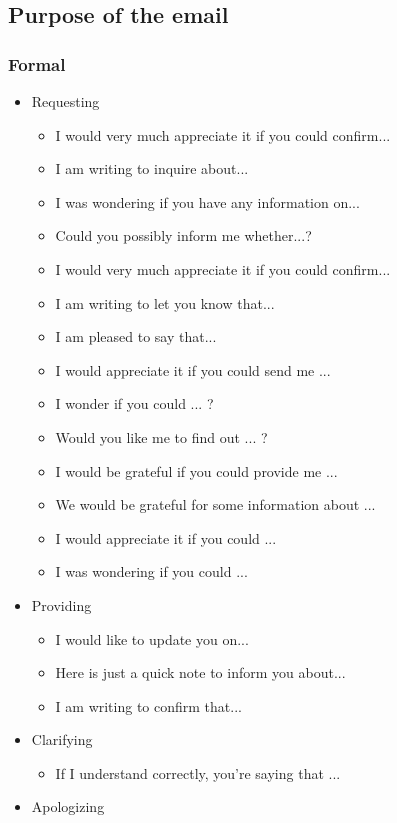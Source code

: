 \subsection{Purpose of the email}

\subsubsection{Formal}
\begin{itemize}
\item Requesting
	\begin{itemize}
	\item I would very much appreciate it if you could confirm...
	\item I am writing to inquire about...
	\item I was wondering if you have any information on...
	\item Could you possibly inform me whether...?
	\item I would very much appreciate it if you could confirm...
	\item I am writing to let you know that...
	\item I am pleased to say that...
	\item I would appreciate it if you could send me ...
	\item I wonder if you could ... ?
	\item Would you like me to find out ... ?
	\item I would be grateful if you could provide me ...
	\item We would be grateful for some information about ...
	\item I would appreciate it if you could ...
	\item I was wondering if you could ...
	\end{itemize}
\item Providing
	\begin{itemize}
	\item I would like to update you on...
	\item Here is just a quick note to inform you about...
	\item I am writing to confirm that...
	\end{itemize}
\item Clarifying
	\begin{itemize}
	\item If I understand correctly, you're saying that ...
	\end{itemize}
\item Apologizing

\end{itemize}
